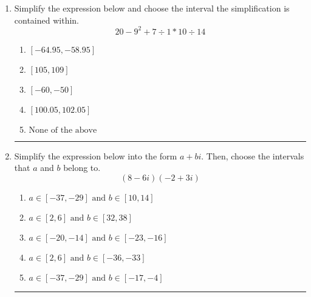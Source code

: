 \documentclass[14pt]{extbook}
\newcommand{\litem}[1]{\item#1\hspace*{-1cm}\rule{\textwidth}{0.4pt}}
\begin{document}
\begin{enumerate}
{\begin{enumerate}[label=\Alph*.]
\end{enumerate} }
\litem{
Simplify the expression below and choose the interval the simplification is contained within.\[ 20 - 9^2 + 7 \div 1 * 10 \div 14 \]\begin{enumerate}[label=\Alph*.]
\item \( [-64.95, -58.95] \)
\item \( [105, 109] \)
\item \( [-60, -50] \)
\item \( [100.05, 102.05] \)
\item \( \text{None of the above} \)

\end{enumerate} }
\litem{
Simplify the expression below into the form $a+bi$. Then, choose the intervals that $a$ and $b$ belong to.\[ (8 - 6 i)(-2 + 3 i) \]\begin{enumerate}[label=\Alph*.]
\item \( a \in [-37, -29] \text{ and } b \in [10, 14] \)
\item \( a \in [2, 6] \text{ and } b \in [32, 38] \)
\item \( a \in [-20, -14] \text{ and } b \in [-23, -16] \)
\item \( a \in [2, 6] \text{ and } b \in [-36, -33] \)
\item \( a \in [-37, -29] \text{ and } b \in [-17, -4] \)

\end{enumerate} }
\end{enumerate}
\end{document}
